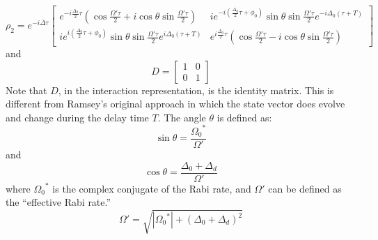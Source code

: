\documentclass{article}
\begin{document}
\noindent 
\[
\rho_2 = e^{-i\overline\Delta\tau}
\begin{bmatrix}
e^{-i\frac{\Delta_0}{2}\tau}\left(\cos\frac{\Omega'\tau}{2} + i\cos\theta\sin\frac{\Omega'\tau}{2}\right)  
& ie^{-i\left(\frac{\Delta_0}{2}\tau + \phi_0 \right)} \sin\theta\sin\frac{\Omega'\tau}{2}e^{-i\Delta_0(\tau+T)}
\\
ie^{i\left(\frac{\Delta_0}{2}\tau + \phi_0 \right)} \sin\theta\sin\frac{\Omega'\tau}{2}e^{i\Delta_0(\tau+T)}
& 
e^{i\frac{\Delta_0}{2}\tau}\left(\cos\frac{\Omega'\tau}{2} - i\cos\theta\sin\frac{\Omega'\tau}{2}\right)  
\end{bmatrix}\]
\noindent
and 
\[D
=
\begin{bmatrix}
1 & 0 \\ 0 & 1
\end{bmatrix}
\]
\noindent
Note that $D$, in the interaction representation, is the identity matrix. This is different from Ramsey's original approach in which the state vector does evolve and change during the delay time $T$. The angle $\theta$ is defined as:
\[
\sin\theta = \frac{{\Omega_0}^*}{\Omega'}
\]
\noindent
and
\[
\cos\theta = \frac{\Delta_0 + \Delta_d}{\Omega'}
\]
\noindent
where ${\Omega_0}^*$ is the complex conjugate of the Rabi rate, and $\Omega'$ can be defined as the ``effective Rabi rate.''
\[
\Omega'= \sqrt{|{\Omega_0}^*| + (\Delta_0 + \Delta_d)^2}
\]
\end{document}
